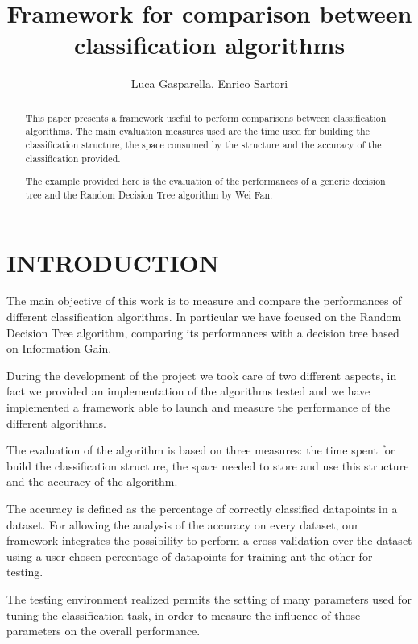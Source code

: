 \documentclass{acm_proc_article-sp-sigmod07}
\begin{document}
\title{Framework for comparison between classification algorithms}
\author{Luca Gasparella, Enrico Sartori}

\maketitle

\begin{abstract}
This paper presents a framework useful to perform comparisons between
classification algorithms.
The main evaluation measures used are the time used for building the
classification structure, the space consumed by the structure and the
accuracy of the classification provided.

The example provided here is the evaluation of the performances of a
generic decision tree and the Random Decision Tree algorithm by Wei Fan.
\end{abstract}

\section{INTRODUCTION}
The main objective of this work is to measure and compare the performances
of different classification algorithms. In particular we have focused on
the Random Decision Tree algorithm, comparing its performances with a
decision tree based on Information Gain.

During the development of the project we took care of two different
aspects, in fact we provided an implementation of the algorithms tested
and we have implemented a framework able to launch and measure the
performance of the different algorithms.

The evaluation of the algorithm is based on three measures: the time spent
for build the classification structure, the space needed to store and use
this structure and the accuracy of the algorithm.

The accuracy is defined as the percentage of correctly classified
datapoints in a dataset.
For allowing the analysis of the accuracy on every dataset, our framework
integrates the possibility to perform a cross validation over the dataset
using a user chosen percentage of datapoints for training ant the other
for testing.

The testing environment realized permits the setting of many parameters
used for tuning the classification task, in order to measure the influence
of those parameters on the overall performance.
\end{document}
